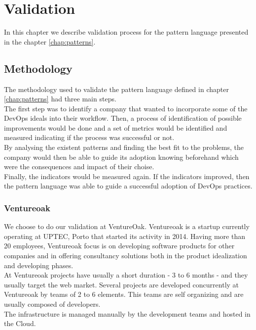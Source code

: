 \chapter{ Validation } \label{chap:validation}
In this chapter we describe validation process for the pattern language presented in the chapter \ref{chap:patterns}.

	\section{Methodology}
	The methodology used to validate the pattern language defined in chapter \ref{chap:patterns} had three main steps. \\
	The first step was to identify a company that wanted to incorporate some of the DevOps ideals into their workflow. Then, a process of identification of possible improvements would be done and a set of metrics would be identified and measured indicating if the process was successful or not. \\
	By analysing the existent patterns and finding the best fit to the problems, the company would then be able to guide its adoption knowing beforehand which were the consequences and impact of their choise. \\
	Finally, the indicators would be measured again. If the indicators improved, then the pattern language was able to guide a successful adoption of DevOps practices.
       \subsection{Ventureoak}
        We choose to do our validation at VentureOak.
        Ventureoak is a startup currently operating at UPTEC, Porto that started its activity in 2014. Having more than 20 employees, Ventureoak focus is on developing software products for other companies and in offering consultancy solutions both in the product idealization and developing phases. \\
        At Ventureoak projects have usually a short duration - 3 to 6 months - and they usually target the web market. Several projects are developed concurrently at Ventureoak by teams of 2 to 6 elements. This teams are self organizing and are usually composed of developers. \\
        The infrastructure is managed manually by the development teams and hosted in the Cloud.
